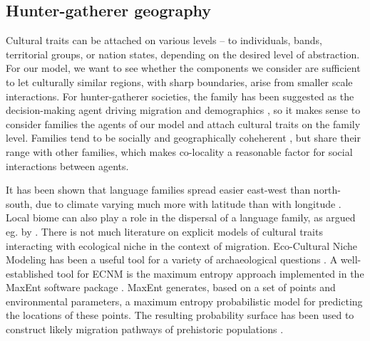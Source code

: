 \documentclass[a4paper,12pt]{scrartcl}
\begin{document}
\subsection{Hunter-gatherer geography}
\label{s:geography}
Cultural traits can be attached on various levels – to individuals, bands,
territorial groups, or nation states, depending on the desired level of
abstraction. For our model, we want to see whether the components we consider
are sufficient to let culturally similar regions, with sharp boundaries, arise
from smaller scale interactions. For hunter-gatherer societies, the family has
been suggested as the decision-making agent driving migration and demographics
\textcite{}, so it makes sense to consider families the agents of our model and
attach cultural traits on the family level. Families tend to be socially and
geographically coheherent \textcite{}, but share their range with other
families, which makes co-locality a reasonable factor for social interactions
between agents.

It has been shown that language families spread easier east-west than
north-south, due to climate varying much more with latitude than with longitude
\parencite{}. Local biome can also play a role in the dispersal of a language
family, as argued eg. by \textcite{grollemund2015bantu,ehret2015bantu}. There is
not much literature on explicit models of cultural traits interacting with
ecological niche in the context of migration. Eco-Cultural Niche Modeling
\parencite[ECNM]{anks2006ecocultural} has been a useful tool for a variety of
archaeological questions
\cite{banks2008human,banks2013ecological,dalpoimguedes2014modeling,kondo2018ecological,walker2019persistence}.
A well-established tool for ECNM is the maximum entropy approach implemented in
the MaxEnt software package
\cite{phillips2006maximum,phillips2008modeling,maxenttutorial}. MaxEnt
generates, based on a set of points and environmental parameters, a maximum
entropy probabilistic model for predicting the locations of these points. The
resulting probability surface has been used to construct likely migration
pathways of prehistoric populations \cite{kondo2018ecological}.
\end{document}
